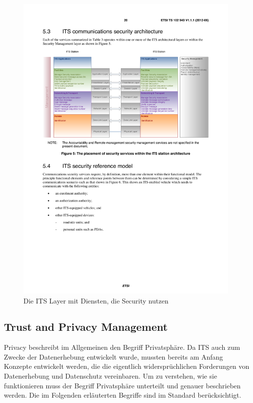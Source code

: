 \begin{figure}
	\includegraphics[width=0.99\textwidth]{content/images/02_architektur/securityDienste.pdf}
	\caption{Die ITS Layer mit Diensten, die Security nutzen \cite{ts102940}}
	\label{fig:architektur_securityDienste}
\end{figure}

\subsection{Trust and Privacy Management \label{architektur_TrustAndPrivacyManagement}}
Privacy beschreibt im Allgemeinen den Begriff Privatsphäre. Da \ac{ITS} auch zum Zwecke der Datenerhebung entwickelt wurde, mussten bereits am Anfang Konzepte entwickelt werden, die die eigentlich widersprüchlichen Forderungen von Datenerhebung und Datenschutz vereinbaren. Um zu verstehen, wie sie funktionieren muss der Begriff Privatsphäre unterteilt und genauer beschrieben werden. Die im Folgenden erläuterten Begriffe sind im Standard berücksichtigt. 

